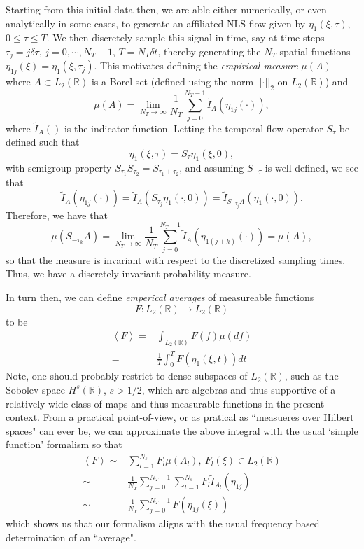 \documentclass[a4paper,11pt]{article}
\begin{document}
Starting from this initial data then, we are able either numerically, or even analytically in some cases, to generate an affiliated NLS flow given by $\eta_{1}(\xi,\tau)$, $0\leq \tau \leq T$.  We then discretely sample this signal in time, say at time steps $\tau_{j} = j\delta \tau$, $j=0,\cdots,N_{T}-1$, $T = N_{T}\delta t$, thereby generating the $N_{T}$ spatial functions $\eta_{1j}(\xi) = \eta_{1}(\xi,\tau_{j})$. This motivates defining the {\it empirical measure} $\mu(A)$ where $A\subset L_{2}(\mathbb{R})$ is a Borel set (defined using the norm $\left|\left|\cdot\right|\right|_{2}$ on $L_{2}(\mathbb{R})$) and 
\[
\mu\left(A\right) = \lim_{N_{T}\rightarrow\infty} \frac{1}{N_{T}}\sum_{j=0}^{N_{T}-1} \tilde{I}_{A}\left(\eta_{1j}\left(\cdot \right) \right),
\]
where $\tilde{I}_{A}\left(\right)$ is the indicator function.  Letting the temporal flow operator $S_{\tau}$ be defined such that 
\[
\eta_{1}(\xi,\tau) = S_{\tau}\eta_{1}(\xi,0),
\]
with semigroup property $S_{\tau_{1}}S_{\tau_{2}} = S_{\tau_{1}+\tau_{2}}$, and assuming $S_{-\tau}$ is well defined, we see that 
\[
\tilde{I}_{A}\left(\eta_{1j}\left(\cdot \right) \right) = \tilde{I}_{A}\left(S_{\tau_{j}}\eta_{1}\left(\cdot,0\right) \right) = \tilde{I}_{S_{-\tau_{j}}A}\left(\eta_{1}\left(\cdot,0\right) \right).
\]
Therefore, we have that 
\[
\mu\left(S_{-\tau_{k}}A \right) = \lim_{N_{T}\rightarrow\infty} \frac{1}{N_{T}}\sum_{j=0}^{N_{T}-1} \tilde{I}_{A}\left(\eta_{1(j+k)}\left(\cdot \right) \right) = \mu\left(A\right),
\]
so that the measure is invariant with respect to the discretized sampling times.  Thus, we have a discretely invariant probability measure.  

In turn then, we can define {\it emperical averages} of measureable functions 
\[
F: L_{2}\left(\mathbb{R}\right) \rightarrow L_{2}\left(\mathbb{R}\right)
\]
to be 
\begin{align*}
\left<F\right> = & \int_{L_{2}(\mathbb{R})}F(f) \mu(df) \\ 
= & \frac{1}{T}\int_{0}^{T}F\left(\eta_{1}(\xi,t) \right)dt
\end{align*}
Note, one should probably restrict to dense subspaces of $L_{2}(\mathbb{R})$, such as the Sobolev space $H^{s}\left(\mathbb{R}\right)$, $s>1/2$, which are algebras and thus supportive of a relatively wide class of maps and thus measurable functions in the present context.  From a practical point-of-view, or as pratical as ``measueres over Hilbert spaces" can ever be, we can approximate the above integral with the usual `simple function' formalism so that 
\begin{align*}
\left<F\right> \sim & \sum_{l=1}^{N_{s}}F_{l}\mu\left(A_{l}\right), ~ F_{l}(\xi)\in L_{2}\left(\mathbb{R}\right)\\
\sim& \frac{1}{N_{T}}\sum_{j=0}^{N_{T}-1}\sum_{l=1}^{N_{s}} F_{l}\tilde{I}_{A_{l}}\left(\eta_{1j}\right)\\
\sim& \frac{1}{N_{T}}\sum_{j=0}^{N_{T}-1}F\left(\eta_{1j}(\xi)\right)
\end{align*}
which shows us that our formalism aligns with the usual frequency based determination of an ``average".  
\end{document}
